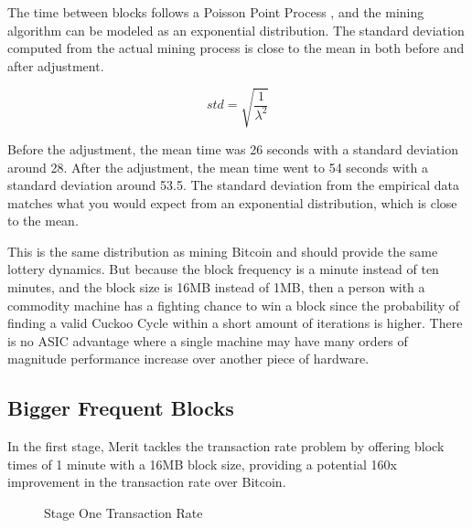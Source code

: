\documentclass{article}
\begin{document}
The time between blocks follows a Poisson Point Process \cite{poisson}, and the
mining algorithm can be modeled as an exponential distribution.
The standard deviation computed from the actual mining process is close to the
mean in both before and after adjustment.

$$std=\sqrt{\frac{1}{\lambda^2}}$$

Before the adjustment, the mean time was 26 seconds with a standard deviation
around 28.  After the adjustment, the mean time went to 54 seconds with a
standard deviation around 53.5.  The standard deviation from the empirical data
matches what you would expect from an exponential distribution, which is
close to the mean.

This is the same distribution as mining Bitcoin \cite{bitpoisson} and should
provide the same lottery dynamics.  But because the block frequency is a minute
instead of ten minutes, and the block size is 16MB instead of 1MB, then a person
with a commodity machine has a fighting chance to win a block since the probability
of finding a valid Cuckoo Cycle within a short amount of iterations is higher.
There is no ASIC advantage where a single machine may have many orders of magnitude
performance increase over another piece of hardware.

\subsection{Bigger Frequent Blocks}

In the first stage, Merit tackles the transaction rate problem by offering block times of 1 minute
with a 16MB block size, providing a potential 160x improvement in the transaction
rate over Bitcoin.

\begin{figure}[H]
    \begin{center}
    \end{center}
    \caption{Stage One Transaction Rate}
\end{figure}
\end{document}
